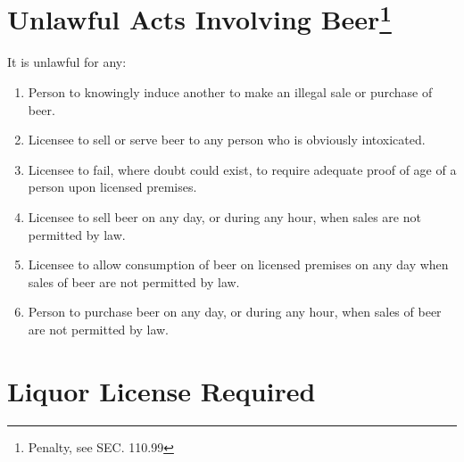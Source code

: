 \section{Unlawful Acts Involving Beer\footnote{Penalty, see SEC. 110.99}}
It is unlawful for any:
\begin{enumerate}[{\indent}A)]
    \item Person to knowingly induce another to make an illegal sale or purchase of beer.
    \item Licensee to sell or serve beer to any person who is obviously intoxicated.
    \item Licensee to fail, where doubt could exist, to require adequate proof of age of a person upon licensed premises.
    \item Licensee to sell beer on any day, or during any hour, when sales are not permitted by law.
    \item Licensee to allow consumption of beer on licensed premises on any day when sales of beer are not permitted by law.
    \item Person to purchase beer on any day, or during any hour, when sales of beer are not permitted by law.
\end{enumerate}


\setcounter{section}{79}
\section{Liquor License Required}
